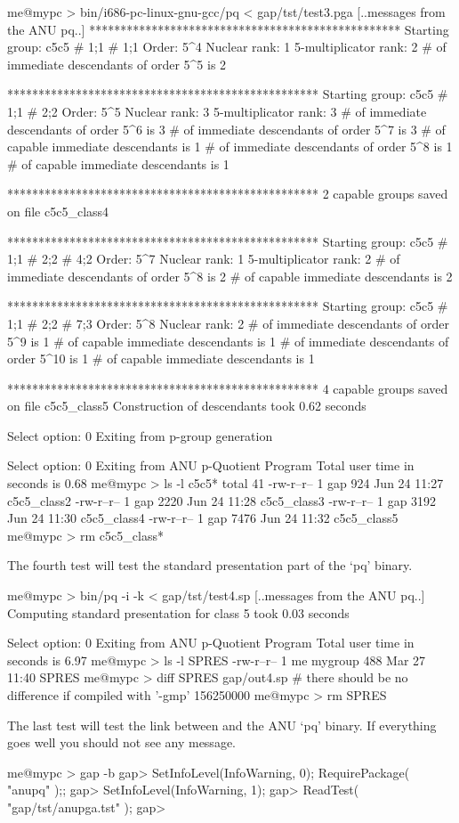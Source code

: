 \begintt
me@mypc > bin/i686-pc-linux-gnu-gcc/pq < gap/tst/test3.pga
[..messages from the ANU pq..]
**************************************************
Starting group: c5c5 # 1;1 # 1;1
Order: 5^4
Nuclear rank: 1
5-multiplicator rank: 2
# of immediate descendants of order 5^5 is 2

**************************************************
Starting group: c5c5 # 1;1 # 2;2
Order: 5^5
Nuclear rank: 3
5-multiplicator rank: 3
# of immediate descendants of order 5^6 is 3
# of immediate descendants of order 5^7 is 3
# of capable immediate descendants is 1
# of immediate descendants of order 5^8 is 1
# of capable immediate descendants is 1

**************************************************
2 capable groups saved on file c5c5_class4

**************************************************
Starting group: c5c5 # 1;1 # 2;2 # 4;2
Order: 5^7
Nuclear rank: 1
5-multiplicator rank: 2
# of immediate descendants of order 5^8 is 2
# of capable immediate descendants is 2

**************************************************
Starting group: c5c5 # 1;1 # 2;2 # 7;3
Order: 5^8
Nuclear rank: 2
# of immediate descendants of order 5^9 is 1
# of capable immediate descendants is 1
# of immediate descendants of order 5^10 is 1
# of capable immediate descendants is 1

**************************************************
4 capable groups saved on file c5c5_class5
Construction of descendants took 0.62 seconds

Select option: 0 
Exiting from p-group generation

Select option: 0 
Exiting from ANU p-Quotient Program
Total user time in seconds is 0.68
me@mypc > ls -l c5c5*
total 41
-rw-r--r--    1 gap     924 Jun 24 11:27 c5c5_class2
-rw-r--r--    1 gap    2220 Jun 24 11:28 c5c5_class3
-rw-r--r--    1 gap    3192 Jun 24 11:30 c5c5_class4
-rw-r--r--    1 gap    7476 Jun 24 11:32 c5c5_class5
me@mypc > rm c5c5_class*
\endtt

The fourth test will test the standard  presentation  part  of  the  `pq'
binary.

\begintt
me@mypc > bin/pq -i -k < gap/tst/test4.sp
[..messages from the ANU pq..]
Computing standard presentation for class 5 took 0.03 seconds

Select option: 0 
Exiting from ANU p-Quotient Program
Total user time in seconds is 6.97
me@mypc > ls -l SPRES
-rw-r--r--    1 me   mygroup        488 Mar 27 11:40 SPRES
me@mypc > diff SPRES gap/out4.sp
# there should be no difference if compiled with '-gmp'
156250000
me@mypc > rm SPRES
\endtt

The last test will test the link between {\GAP} and the ANU `pq'  binary.
If everything goes well you should not see any message.

\begintt
me@mypc > gap -b
gap> SetInfoLevel(InfoWarning, 0); RequirePackage( "anupq" );;
gap> SetInfoLevel(InfoWarning, 1);
gap> ReadTest( "gap/tst/anupga.tst" );
gap>
\endtt

